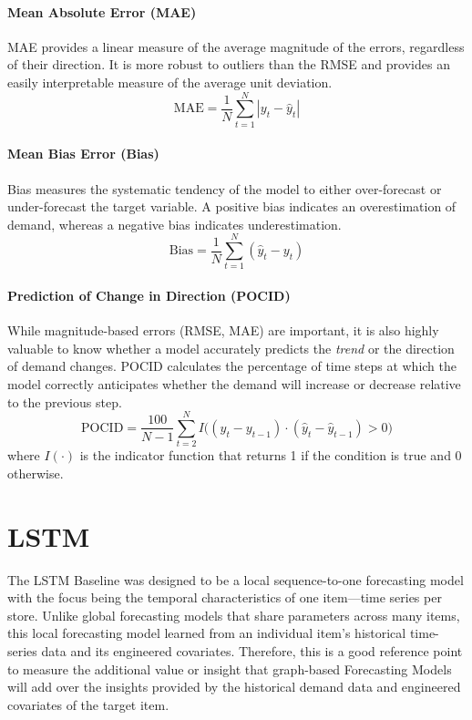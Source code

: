 \paragraph{Mean Absolute Error (MAE)}
MAE provides a linear measure of the average magnitude of the errors, regardless of their direction. It is more robust to outliers than the RMSE and provides an easily interpretable measure of the average unit deviation.
\[
\text{MAE} = \frac{1}{N}\sum_{t=1}^{N}|y_t - \hat{y}_t|
\]

\paragraph{Mean Bias Error (Bias)}
Bias measures the systematic tendency of the model to either over-forecast or under-forecast the target variable. A positive bias indicates an overestimation of demand, whereas a negative bias indicates underestimation.
\[
\text{Bias} = \frac{1}{N}\sum_{t=1}^{N}(\hat{y}_t - y_t)
\]

\paragraph{Prediction of Change in Direction (POCID)}
While magnitude-based errors (RMSE, MAE) are important, it is also highly valuable to know whether a model accurately predicts the \textit{trend} or the direction of demand changes. POCID calculates the percentage of time steps at which the model correctly anticipates whether the demand will increase or decrease relative to the previous step.
\[
\text{POCID} = \frac{100}{N-1} \sum_{t=2}^{N} I\big((y_t - y_{t-1}) \cdot (\hat{y}_t - \hat{y}_{t-1}) > 0 \big)
\]
where $I(\cdot)$ is the indicator function that returns 1 if the condition is true and 0 otherwise.



\section{LSTM}


The LSTM Baseline was designed to be a local sequence-to-one forecasting model with the focus being the temporal characteristics of one item—time series per store. Unlike global forecasting models that share parameters across many items, this local forecasting model learned from an individual item's historical time-series data and its engineered covariates. Therefore, this is a good reference point to measure the additional value or insight that graph-based Forecasting Models will add over the insights provided by the historical demand data and engineered covariates of the target item.

